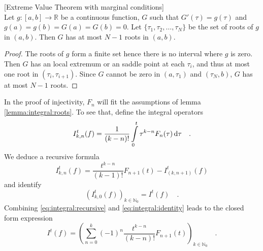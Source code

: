 \begin{lemma}\label{lemma:integral:roots}[Extreme Value Theorem with 
marginal conditions]\\
Let $g:[a,b]\to \mathbb{R}$ be a continuous function, $G$ such that 
$G'(\tau)=g(\tau)$ and $g(a)=g(b)=G(a)=G(b)=0$. Let $\{\tau_1,\tau_2,
\ldots, \tau_N\}$ be the set of roots of $g$ in $(a,b)$. Then $G$ has 
at most $N-1$ roots in $(a,b)$.
\end{lemma}
\begin{proof}
The roots of $g$ form a finite set hence there is no interval where $g$ 
is zero. Then $G$ has an local extremum or an saddle point at each $
\tau_i$, 
and thus at most one root in $(\tau_i,\tau_{i+1})$. Since $G$ cannot be 
zero in $(a,\tau_1)$ and $(\tau_N,b)$, $G$ has at most 
$N-1$ roots.
\end{proof}

In the proof of injectivity, $F_n$ will fit the assumptions of lemma 
\ref{lemma:integral:roots}. To see that, define the 
integral operators
\begin{equation}
I_{k,n}^t(f) = \frac{1}{(k-n)!}\int\limits_0^t \tau^{k-n} F_n(\tau) \, \text{d}\tau \quad .
\end{equation}
We deduce a recursive formula 
\begin{equation}
I^t_{k,n}(f) = \frac{t^{k-n}}{(k-1)!}F_{n+1}(t) - I^t_{(k,n+1)}(f)  
\label{eq:integral:recursive}
\end{equation}
and identify 
\begin{equation}
\left(I^t_{k,0}(f)\right)_{k\in\mathbb{N}_0}=I^t(f) \quad . 
\label{eq:integral:identity}
\end{equation}
Combining \eqref{eq:integral:recursive} and 
\eqref{eq:integral:identity} leads to the closed form expression
\begin{equation}
I^t(f) = \left( \sum\limits_{n=0}^k (-1)^n\frac{t^{k-n}}{(k-n)!} 
F_{n+1}(t)
\right)_{k\in\mathbb{N}_0} \quad . \label{eq:integral:closed}
\end{equation}


